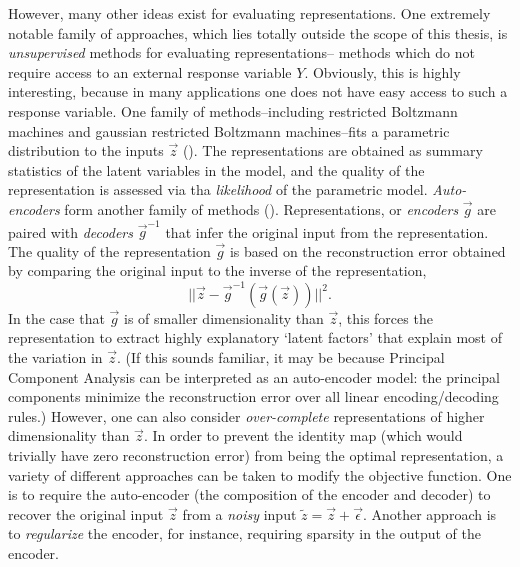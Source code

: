 However, many other ideas exist for evaluating representations.  One
extremely notable family of approaches, which lies totally outside the
scope of this thesis, is \emph{unsupervised} methods for evaluating
representations-- methods which do not require access to an external
response variable $Y$.  Obviously, this is highly interesting, because
in many applications one does not have easy access to such a response
variable.  One family of methods--including restricted Boltzmann
machines and gaussian restricted Boltzmann machines--fits a parametric
distribution to the inputs $\vec{z}$ (\cite{hinton2006reducing}).  The representations are
obtained as summary statistics of the latent variables in the model,
and the quality of the representation is assessed via tha
\emph{likelihood} of the parametric model.  \emph{Auto-encoders} form
another family of methods (\cite{baldi2012autoencoders}).  Representations, or \emph{encoders}
$\vec{g}$ are paired with \emph{decoders} $\vec{g}^{-1}$ that infer
the original input from the representation.  The quality of the
representation $\vec{g}$ is based on the reconstruction error obtained
by comparing the original input to the inverse of the representation,
\[
||\vec{z} - \vec{g}^{-1}(\vec{g}(\vec{z}))||^2.
\]
In the case that $\vec{g}$ is of smaller dimensionality than
$\vec{z}$, this forces the representation to extract highly
explanatory `latent factors' that explain most of the variation in
$\vec{z}$.  (If this sounds familiar, it may be because Principal
Component Analysis can be interpreted as an auto-encoder model: the
principal components minimize the reconstruction error over all linear
encoding/decoding rules.)  However, one can also consider
\emph{over-complete} representations of higher dimensionality than
$\vec{z}$.  In order to prevent the identity map (which would
trivially have zero reconstruction error) from being the optimal
representation, a variety of different approaches can be taken to
modify the objective function.  One is to require the auto-encoder
(the composition of the encoder and decoder) to recover the original
input $\vec{z}$ from a \emph{noisy} input $\tilde{z} = \vec{z} +
\vec{\epsilon}$.  Another approach is to \emph{regularize} the
encoder, for instance, requiring sparsity in the output of the
encoder.

